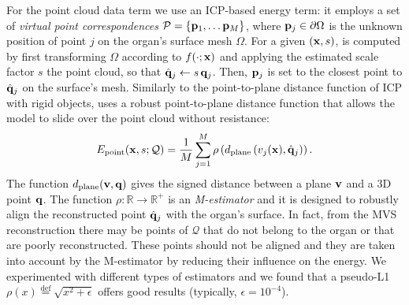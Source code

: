 
For the point cloud data term \Epoint we use an ICP-based energy term: it employs a set of \emph{virtual point correspondences} $\mathcal{P}=\{\mathbf{p}_1,\dots \mathbf{p}_M\}$, where $\mathbf{p}_j\in\partial \Omega$ is the unknown position of point $j$ on the organ's surface mesh $\Omega$. 
For a given $(\mathbf{x},s)$, \Epoint is computed by first transforming $\Omega$ according to $f(\cdot;\mathbf{x})$ and applying the estimated scale factor $s$ the point cloud, so that $\hat{\mathbf{q}}_{j}\gets s\,\mathbf{q}_{j}$.
Then, $\mathbf{p}_j$ is set to the closest point to $\hat{\mathbf{q}}_{j}$ on the surface's mesh.
Similarly to the point-to-plane distance function of ICP with rigid objects, \Epoint uses a robust point-to-plane distance function that allows the model to slide over the point cloud without resistance:
\begin{equation}
E_{\text{point}}(\mathbf{x},s;\mathcal{Q})=\frac{1}{M}\sum_{j=1}^{M}\rho\left(d_{\text{plane}}\left(v_{j}(\mathbf{x}),\hat{\mathbf{q}}_{j}\right)\right).
\end{equation}
\noindent The function $d_{\text{plane}}(\mathbf{v},\mathbf{q})$ gives the signed distance between a plane $\mathbf{v}$ and a 3D point $\mathbf{q}$.
The function $\rho:\mathbb{R}\rightarrow\mathbb{R}^{+}$ is an \emph{M-estimator} and it is designed to robustly align the reconstructed point $\hat{\mathbf{q}}_{j}$ with the organ's surface. 
In fact, from the MVS reconstruction there may be points of $\mathcal{Q}$ that do not belong to the organ or that are poorly reconstructed.
These points should not be aligned and they are taken into account by the M-estimator by reducing their influence on the energy.
We experimented with different types of estimators and we found that a pseudo-L1 $\rho({x})\overset{\mathrm{def}}{=}\sqrt{{x}^{2}+\epsilon}$ offers good results (typically, $\epsilon = 10^{-4}$).

